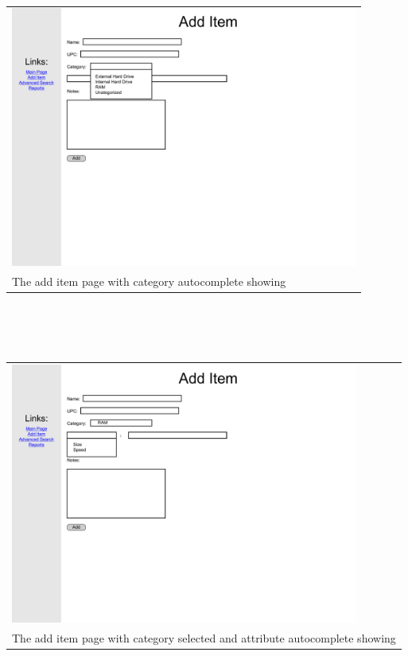 \documentclass{article}
\begin{document}
~\\
\begin{tabular}{ p{4.5in} }
\includegraphics[keepaspectratio, width=4.5in]{addItemF0S1.pdf}\\
The add item page with category autocomplete showing
\end{tabular}\\
~\\
~\\
\begin{tabular}{ p{4.5in} }
\includegraphics[keepaspectratio, width=4.5in]{addItemF0S2.pdf}  \\
The add item page with category selected and attribute autocomplete showing
\end{tabular}\\
~\\
~\\
\end{document}
